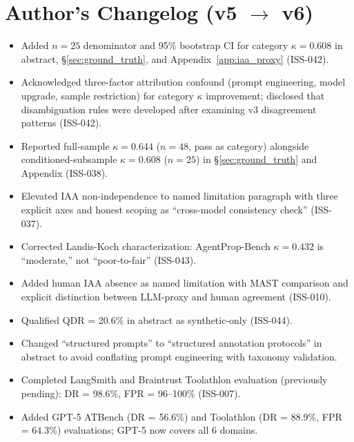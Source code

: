 \documentclass[11pt]{article}
\begin{document}
\section*{Author's Changelog (v5 $\to$ v6)}
\begin{itemize}[leftmargin=2em,itemsep=1pt]
  \item Added $n = 25$ denominator and 95\% bootstrap CI for category
    $\kappa = 0.608$ in abstract, \S\ref{sec:ground_truth}, and
    Appendix~\ref{app:iaa_proxy} (ISS-042).
  \item Acknowledged three-factor attribution confound (prompt engineering,
    model upgrade, sample restriction) for category $\kappa$ improvement;
    disclosed that disambiguation rules were developed after examining
    v3 disagreement patterns (ISS-042).
  \item Reported full-sample $\kappa = 0.644$ ($n = 48$, pass as category)
    alongside conditioned-subsample $\kappa = 0.608$ ($n = 25$) in
    \S\ref{sec:ground_truth} and Appendix (ISS-038).
  \item Elevated IAA non-independence to named limitation paragraph with
    three explicit axes and honest scoping as ``cross-model consistency
    check'' (ISS-037).
  \item Corrected Landis-Koch characterization: AgentProp-Bench
    $\kappa = 0.432$ is ``moderate,'' not ``poor-to-fair'' (ISS-043).
  \item Added human IAA absence as named limitation with MAST comparison
    and explicit distinction between LLM-proxy and human agreement
    (ISS-010).
  \item Qualified QDR = 20.6\% in abstract as synthetic-only (ISS-044).
  \item Changed ``structured prompts'' to ``structured annotation
    protocols'' in abstract to avoid conflating prompt engineering with
    taxonomy validation.
  \item Completed LangSmith and Braintrust Toolathlon evaluation
    (previously pending): DR = 98.6\%, FPR = 96--100\% (ISS-007).
  \item Added GPT-5 ATBench (DR = 56.6\%) and Toolathlon (DR = 88.9\%,
    FPR = 64.3\%) evaluations; GPT-5 now covers all 6 domains.
\end{itemize}


\end{document}
